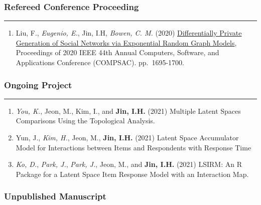 \documentclass[
]{book}
\providecommand{\tightlist}{%
  \setlength{\itemsep}{0pt}\setlength{\parskip}{0pt}}
\begin{document}
\hypertarget{refereed-conference-proceeding}{%
\subsubsection*{Refereed Conference Proceeding}\label{refereed-conference-proceeding}}

\begin{center}\rule{0.5\linewidth}{0.5pt}\end{center}

\begin{enumerate}
\def\labelenumi{\arabic{enumi}.}
\tightlist
\item
  Liu, F., \emph{Eugenio, E.}, Jin, I.H, \emph{Bowen, C. M.} (2020) \href{https://www.researchgate.net/publication/345376724_Differentially_Private_Generation_of_Social_Networks_via_Exponential_Random_Graph_Models}{Differentially Private Generation of Social Networks via Exponential Random Graph Models}, Proceedings of 2020 IEEE 44th Annual Computers, Software, and Applications Conference (COMPSAC). pp.~1695-1700.
\end{enumerate}

\hypertarget{ongoing-project}{%
\subsubsection*{Ongoing Project}\label{ongoing-project}}

\begin{center}\rule{0.5\linewidth}{0.5pt}\end{center}

\begin{enumerate}
\def\labelenumi{\arabic{enumi}.}
\item
  \emph{You, K.}, Jeon, M., Kim, I., and \textbf{Jin, I.H.} (2021) Multiple Latent Spaces Comparisons Using the Topological Analysis.
\item
  Yun, J., \emph{Kim, H.}, Jeon, M., \textbf{Jin, I.H.} (2021) Latent Space Accumulator Model for Interactions between Items and Respondents with Response Time
\item
  \emph{Ko, D.}, \emph{Park, J.}, \emph{Park, J.}, Jeon, M., and \textbf{Jin, I.H.} (2021) LSIRM: An R Package for a Latent Space Item Response Model with an Interaction Map.
\end{enumerate}

\hypertarget{unpublished-manuscript}{%
\subsubsection*{Unpublished Manuscript}\label{unpublished-manuscript}}
\end{document}
